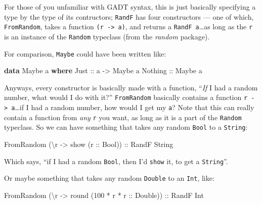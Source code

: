 \documentclass[]{article}
\newenvironment{Shaded}{}{}
\newcommand{\KeywordTok}[1]{\textcolor[rgb]{0.00,0.44,0.13}{\textbf{{#1}}}}
\newcommand{\DataTypeTok}[1]{\textcolor[rgb]{0.56,0.13,0.00}{{#1}}}
\newcommand{\DecValTok}[1]{\textcolor[rgb]{0.25,0.63,0.44}{{#1}}}
\newcommand{\OtherTok}[1]{\textcolor[rgb]{0.00,0.44,0.13}{{#1}}}
\newcommand{\FunctionTok}[1]{\textcolor[rgb]{0.02,0.16,0.49}{{#1}}}
\newcommand{\NormalTok}[1]{{#1}}
\begin{document}
For those of you unfamiliar with GADT syntax, this is just basically
specifying a type by the type of its contructors; \texttt{RandF} has
four constructors --- one of which, \texttt{FromRandom}, takes a
function \texttt{(r\ -\textgreater{}\ a)}, and returns a
\texttt{RandF\ a}\ldots{}as long as the \texttt{r} is an instance of the
\texttt{Random} typeclass (from the \emph{random} package).

For comparison, \texttt{Maybe} could have been written like:

\begin{Shaded}
\begin{Highlighting}[]
\KeywordTok{data} \DataTypeTok{Maybe} \NormalTok{a }\KeywordTok{where}
    \DataTypeTok{Just}\OtherTok{    ::} \NormalTok{a }\OtherTok{->} \DataTypeTok{Maybe} \NormalTok{a}
    \DataTypeTok{Nothing}\OtherTok{ ::} \DataTypeTok{Maybe} \NormalTok{a}
\end{Highlighting}
\end{Shaded}

Anyways, every constructor is basically made with a function,
``\emph{If} I had a random number, what would I do with it?''
\texttt{FromRandom} basically contains a function
\texttt{r\ -\textgreater{}\ a}\ldots{}if I had a random number, how
would I get my \texttt{a}? Note that this can really contain a function
from \emph{any} \texttt{r} you want, as long as it is a part of the
\texttt{Random} typeclass. So we can have something that takes any
random \texttt{Bool} to a \texttt{String}:

\begin{Shaded}
\begin{Highlighting}[]
\DataTypeTok{FromRandom} \NormalTok{(\textbackslash{}r }\OtherTok{->} \NormalTok{show (}\OtherTok{r ::} \DataTypeTok{Bool}\NormalTok{))}\OtherTok{ ::} \DataTypeTok{RandF} \DataTypeTok{String}
\end{Highlighting}
\end{Shaded}

Which says, ``if I had a random \texttt{Bool}, then I'd \texttt{show}
it, to get a \texttt{String}''.

Or maybe something that takes any random \texttt{Double} to an
\texttt{Int}, like:

\begin{Shaded}
\begin{Highlighting}[]
\DataTypeTok{FromRandom} \NormalTok{(\textbackslash{}r }\OtherTok{->} \NormalTok{round (}\DecValTok{100} \FunctionTok{*} \NormalTok{r }\FunctionTok{*}\OtherTok{ r ::} \DataTypeTok{Double}\NormalTok{))}\OtherTok{ ::} \DataTypeTok{RandF} \DataTypeTok{Int}
\end{Highlighting}
\end{Shaded}
\end{document}
